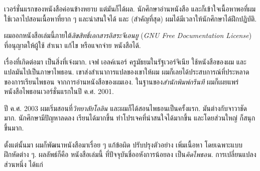 
เวอร์ชั่นแรกของหนังสือค่อนข้างหยาบ แต่มันก็ได้ผล.
นักศึกษาอ่านหนังสือ 
และก็เข้าใจเนื้อหาพอที่ผมใช้เวลาไปสอนเนื้อหาที่ยาก ๆ และน่าสนใจได้ 
และ (สำคัญที่สุด) ผมได้มีเวลาให้นักศึกษาได้ฝึกปฏิบัติ.


ผมออกหนังสือเล่มนี้ภายใต้\textit{ลิขสิทธิ์เอกสารอิสระจีเอนยู} (\textit{GNU Free Documentation License})
ที่อนุญาตให้ผู้ใช้ สำเนา แก้ไข หรือแจกจ่าย หนังสือได้.


เรื่องที่เกิดต่อมา เป็นสิ่งที่เจ๋งมาก.
เจฟ เอลค์เนอร์ ครูมัธยมในรัฐเวอร์จิเนีย ใช้หนังสือของผม
และแปลมันไปเป็นภาษาไพธอน.
เขาส่งสำเนาการแปลของเขาให้ผม
ผมก็เลยได้ประสบการณ์ที่ประหลาดของการเรียนไพธอน
จากการอ่านหนังสือของผมเอง.
ในฐานของ\textit{สำนักพิมพ์กรีนที} ผมก็เผยแพร่หนังสือไพธอนเวอร์ชั่นแรกในปี ค.ศ. 2001.


ปี ค.ศ. 2003 ผมเริ่มสอนที่\textit{วิทยาลัยโอลิน}
และผมก็ได้สอนไพธอนเป็นครั้งแรก.
มันต่างกับจาวาชัดมาก.
นักศึกษามีปัญหาลดลง เรียนได้มากขึ้น ทำโปรเจคที่น่าสนใจได้มากขึ้น
และโดยส่วนใหญ่ ก็สนุกขึ้นมาก.


ตั้งแต่นั้นมา ผมก็พัฒนาหนังสือมาเรื่อย ๆ
แก้ข้อผิด ปรับปรุงตัวอย่าง เพิ่มเนื้อหา โดยเฉพาะแบบฝึกหัดต่าง ๆ.
%
%
ผลลัพธ์ก็คือ หนังสือเล่มนี้
ที่ปัจจุบันชื่ออหังการน้อยลง เป็น\textit{คิดไพธอน}.
การเปลี่ยนแปลงส่วนหนึ่ง ได้แก่

